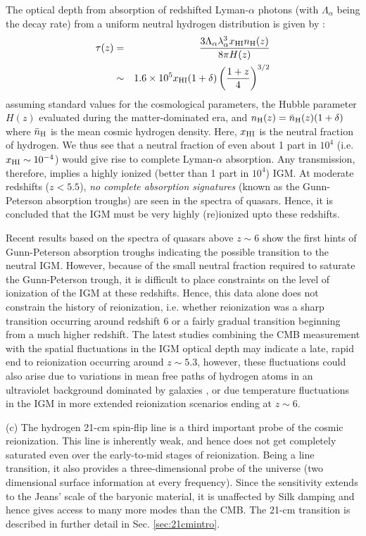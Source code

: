 The optical depth from absorption of redshifted Lyman-$\alpha$ photons (with $\Lambda_{\alpha}$ being the decay rate) from a uniform neutral hydrogen distribution is given by \cite{gunnpeterson}: 
\begin{eqnarray}
 \tau(z) &=& \frac{3 \Lambda_{\alpha} \lambda_{\alpha}^3 x_{\rm HI} n_{\rm H} (z)}{8 \pi H(z)} \nonumber \\
 &\sim & 1.6 \times 10^5 x_{\rm HI} (1 + \delta) \left(\frac{1+z}{4}\right)^{3/2}
\end{eqnarray} 
assuming standard values for the cosmological parameters, the Hubble parameter $H(z)$ evaluated during the matter-dominated era, and $n_{\rm H}(z) = \bar{n}_{\rm H}(z) (1 + \delta)$ where $\bar{n}_{\rm H}$ is the mean cosmic hydrogen density. 
Here, $x_{\rm HI}$ is the neutral fraction of hydrogen. We thus see that a neutral fraction of even about 1 part in $10^4$ (i.e. $x_{\rm HI} \sim 10^{-4}$) would give rise to complete Lyman-$\alpha$ absorption. Any transmission, therefore, implies a highly ionized (better than 1 part in $10^4$) IGM. At moderate redshifts ($z < 5.5$), \textit{no  complete absorption signatures} (known as the Gunn-Peterson absorption troughs) are seen in the spectra of quasars. Hence, it is concluded that the IGM must be very highly (re)ionized upto these redshifts. 

Recent results based on the spectra of quasars above $z \sim 6$ show the first hints of Gunn-Peterson absorption troughs indicating the possible transition to the neutral IGM. However, because of the small neutral fraction required to saturate the Gunn-Peterson trough, it is difficult to place constraints on the level of ionization of the IGM at these redshifts. Hence, this data alone does not constrain the history of reionization, i.e. whether reionization was a sharp transition occurring around redshift 6 or a fairly gradual transition beginning from a much higher redshift.  The latest studies combining the CMB measurement with the spatial fluctuations in the IGM optical depth \cite{kulkarni2019, nasir2020, raste2021, davies2016} may indicate a late, rapid end to reionization occurring around $z \sim 5.3$, however, these fluctuations could also arise due to variations in mean free paths of hydrogen atoms in an  ultraviolet background dominated by galaxies \cite{davies2016}, or due temperature fluctuations in the IGM \cite{dalonsio2015} in more extended reionization scenarios ending at $z \sim 6$.

(c) The hydrogen 21-cm spin-flip line is a third important probe of the cosmic reionization. This line is inherently weak, and hence does not get completely saturated even over the early-to-mid stages of reionization. Being a line transition, it also provides a three-dimensional probe of the universe (two dimensional surface information at every frequency). Since the sensitivity extends to the Jeans' scale of the baryonic material, it is unaffected by Silk damping and hence gives access to many more modes than the CMB. The 21-cm transition is described in further detail in Sec. \ref{sec:21cmintro}.

